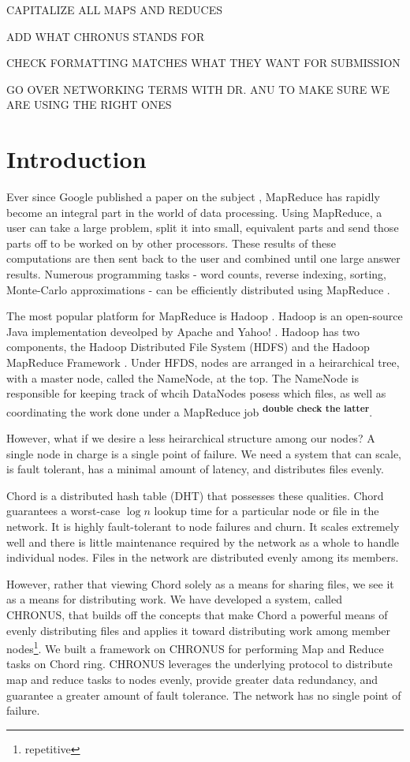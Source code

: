 \documentclass[conference, compsocconf, letterpaper]{IEEEtran}
\begin{document}
CAPITALIZE ALL MAPS AND REDUCES

ADD WHAT CHRONUS STANDS FOR

CHECK FORMATTING MATCHES WHAT THEY WANT FOR SUBMISSION

GO OVER NETWORKING TERMS WITH DR. ANU TO MAKE SURE WE ARE USING THE RIGHT ONES

\section{Introduction}

Ever since Google published a paper on the subject \cite{mapreduce}, MapReduce has rapidly become an integral part in the world of data processing.  Using MapReduce, a user can take a large problem, split it into small, equivalent parts and send those parts off to be worked on by other processors.  These results of these computations are then sent back to the user and combined until one large answer results.  Numerous programming tasks - word counts, reverse indexing, sorting, Monte-Carlo approximations - can be efficiently distributed using MapReduce \cite{mapreduce}.

The most popular platform for MapReduce is Hadoop \cite{Hadoop}. Hadoop is an open-source Java implementation deveolped by Apache and Yahoo! \cite{pavlo2009comparison}.  Hadoop has two components, the Hadoop Distributed File System (HDFS) and the Hadoop MapReduce Framework \cite{mrsurvey}.  Under HFDS, nodes are arranged in a heirarchical tree, with a master node, called the NameNode, at the top.  The NameNode is responsible for keeping track of whcih DataNodes posess which files, as well as coordinating the work done under a MapReduce job \textsuperscript{\textbf{double check the latter}}. 
 
However, what if we desire a less heirarchical structure among our nodes?  A single node in charge is a single point of failure.  We need a system that can scale, is fault tolerant, has a minimal amount of latency, and distributes files evenly. 

Chord \cite{Chord} is a distributed hash table (DHT) that possesses these qualities.  Chord guarantees a worst-case $\log n$ lookup time for a particular node or file in the network. It is highly fault-tolerant to node failures and churn.  It scales extremely well and there is little maintenance required by the network as a whole to handle individual nodes.  Files in the network are distributed evenly among its members.
 
However, rather that viewing Chord solely as a means for sharing files, we see it as a means for distributing work.  We have developed a system, called CHRONUS, that builds off the concepts that make Chord a powerful means of evenly distributing files and applies it toward distributing work among member nodes\footnote{repetitive}.  We built a framework on CHRONUS for performing Map and Reduce tasks on Chord ring.  CHRONUS leverages the underlying protocol to distribute map and reduce tasks to nodes evenly, provide greater data redundancy, and guarantee a greater amount of fault tolerance.  The network has no single point of failure.
\end{document}
